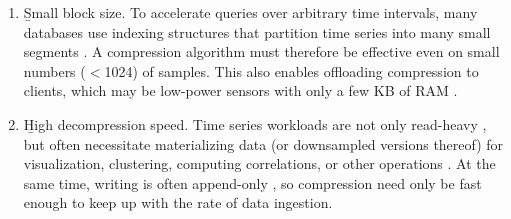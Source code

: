 \begin{enumerate}
\itemsep0mm
\item \b{Small block size}. To accelerate queries over arbitrary time intervals, many databases use indexing structures that partition time series into many small segments \cite{berkeleyTreeDB, respawnDB}. A compression algorithm must therefore be effective even on small numbers ($<$1024) of samples. This also enables offloading compression to clients, which may be low-power sensors with only a few KB of RAM \cite{respawnDB}.
\item \b{High decompression speed}. Time series workloads are not only read-heavy \cite{respawnDB, berkeleyTreeDB, influxDB}, but often necessitate materializing data (or downsampled versions thereof) for visualization, clustering, computing correlations, or other operations \cite{respawnDB}. At the same time, writing is often append-only \cite{gorilla, respawnDB}, so compression need only be fast enough to keep up with the rate of data ingestion.

\end{enumerate}

